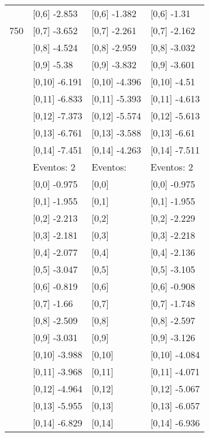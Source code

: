 \begin{table}
\begin{tabular}[t]{llll}
 & {}[0,6] -2.853 & {}[0,6] -1.382 & {}[0,6] -1.31\\
750 & {}[0,7] -3.652 & {}[0,7] -2.261 & {}[0,7] -2.162\\
\addlinespace
 & {}[0,8] -4.524 & {}[0,8] -2.959 & {}[0,8] -3.032\\
 & {}[0,9] -5.38 & {}[0,9] -3.832 & {}[0,9] -3.601\\
 & {}[0,10] -6.191 & {}[0,10] -4.396 & {}[0,10] -4.51\\
 & {}[0,11] -6.833 & {}[0,11] -5.393 & {}[0,11] -4.613\\
 & {}[0,12] -7.373 & {}[0,12] -5.574 & {}[0,12] -5.613\\
\addlinespace
 & {}[0,13] -6.761 & {}[0,13] -3.588 & {}[0,13] -6.61\\
 & {}[0,14] -7.451 & {}[0,14] -4.263 & {}[0,14] -7.511\\
 & Eventos:  2 & Eventos: & Eventos:  2\\
 & {}[0,0] -0.975 & {}[0,0] & {}[0,0] -0.975\\
 & {}[0,1] -1.955 & {}[0,1] & {}[0,1] -1.955\\
\addlinespace
 & {}[0,2] -2.213 & {}[0,2] & {}[0,2] -2.229\\
 & {}[0,3] -2.181 & {}[0,3] & {}[0,3] -2.218\\
 & {}[0,4] -2.077 & {}[0,4] & {}[0,4] -2.136\\
 & {}[0,5] -3.047 & {}[0,5] & {}[0,5] -3.105\\
 & {}[0,6] -0.819 & {}[0,6] & {}[0,6] -0.908\\
\addlinespace
1000 & {}[0,7] -1.66 & {}[0,7] & {}[0,7] -1.748\\
 & {}[0,8] -2.509 & {}[0,8] & {}[0,8] -2.597\\
 & {}[0,9] -3.031 & {}[0,9] & {}[0,9] -3.126\\
 & {}[0,10] -3.988 & {}[0,10] & {}[0,10] -4.084\\
 & {}[0,11] -3.968 & {}[0,11] & {}[0,11] -4.071\\
\addlinespace
 & {}[0,12] -4.964 & {}[0,12] & {}[0,12] -5.067\\
 & {}[0,13] -5.955 & {}[0,13] & {}[0,13] -6.057\\
 & {}[0,14] -6.829 & {}[0,14] & {}[0,14] -6.936\\
\bottomrule
\end{tabular}
\end{table}
